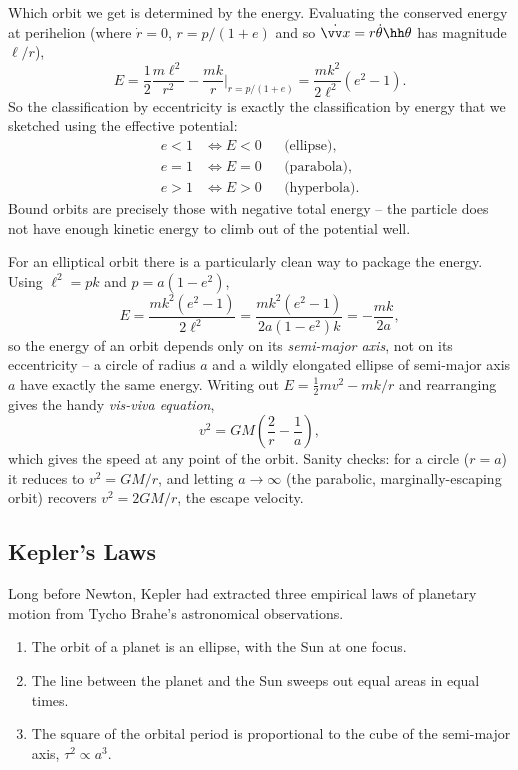 Which orbit we get is determined by the energy. Evaluating the conserved energy at perihelion (where $\dot{r} = 0$, $r = p/(1 + e)$ and so $\dot{\vv x} = r\dot\theta \hh\theta$ has magnitude $\ell/r$),
$$
E = \frac{1}{2}\frac{m \ell^2}{r^2} - \frac{mk}{r}\bigg|_{r = p/(1+e)} = \frac{mk^2}{2\ell^2}\left(e^2 - 1\right).
$$
So the classification by eccentricity is exactly the classification by energy that we sketched using the effective potential:
\begin{align*}
	e < 1 &\iff E < 0 && \text{(ellipse)}, \\
	e = 1 &\iff E = 0 && \text{(parabola)}, \\
	e > 1 &\iff E > 0 && \text{(hyperbola)}.
\end{align*}
Bound orbits are precisely those with negative total energy -- the particle does not have enough kinetic energy to climb out of the potential well.

For an elliptical orbit there is a particularly clean way to package the energy. Using $\ell^2 = pk$ and $p = a(1 - e^2)$,
$$
E = \frac{mk^2(e^2 - 1)}{2\ell^2} = \frac{mk^2 (e^2 - 1)}{2 a (1 - e^2)k} = -\frac{mk}{2a},
$$
so the energy of an orbit depends only on its \emph{semi-major axis}, not on its eccentricity -- a circle of radius $a$ and a wildly elongated ellipse of semi-major axis $a$ have exactly the same energy. Writing out $E = \frac{1}{2}mv^2 - mk/r$ and rearranging gives the handy \emph{vis-viva equation},
$$
v^2 = GM\left(\frac{2}{r} - \frac{1}{a}\right),
$$
which gives the speed at any point of the orbit. Sanity checks: for a circle ($r = a$) it reduces to $v^2 = GM/r$, and letting $a \to \infty$ (the parabolic, marginally-escaping orbit) recovers $v^2 = 2GM/r$, the escape velocity.

\subsection{Kepler's Laws}

Long before Newton, Kepler had extracted three empirical laws of planetary motion from Tycho Brahe's astronomical observations.

\begin{law}
	\begin{enumerate}
		\item The orbit of a planet is an ellipse, with the Sun at one focus.
		\item The line between the planet and the Sun sweeps out equal areas in equal times.
		\item The square of the orbital period is proportional to the cube of the semi-major axis, $\tau^2 \propto a^3$.
	\end{enumerate}
\end{law}


